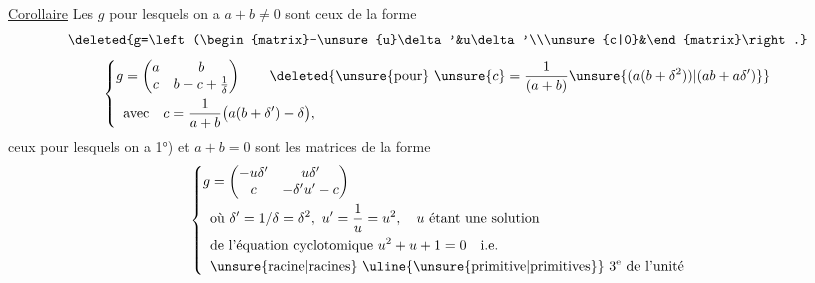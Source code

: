 
\uline{Corollaire} Les $g$ pour lesquels on a   $a+b\ne0$ sont ceux de la forme
\[
\deleted{g=\left(\begin{matrix}-\unsure{u}\delta'&u\delta'\\\unsure{c|0}&\end{matrix}\right.}
\]
\[
\left\{\begin{aligned}
g&=\begin{pmatrix}a&b\\c&b-c+\frac1\delta\end{pmatrix}\qquad\deleted{\unsure{\text{pour}}\ \unsure{c}=\frac1{(a+b)}\unsure{(a(b+\delta^2))|(ab+a\delta')}}\\
&\text{avec}\quad c=\frac1{a+b}\bigl(a(b+\delta')-\delta\bigr),
\end{aligned}\right.
\]
ceux pour lesquels on a 1°) et $a+b=0$ sont  les matrices de la forme
\[
\left\{\begin{aligned}
g&=\begin{pmatrix}-u\delta'&u\delta'\\c&-\delta'u'-c\end{pmatrix}\\
&\text{où }\delta'=1/\delta=\delta^2,\ u'=\frac1u=u^2,\quad u\text{ étant une solution}\\
&\text{de l'équation cyclotomique }u^2+u+1=0\quad\text{i.e.}\\
&\text{\unsure{racine|racines} \uline{\unsure{primitive|primitives}} }3^{\mathrm e}\text{ de l'unité}
\end{aligned}\right.
\]
